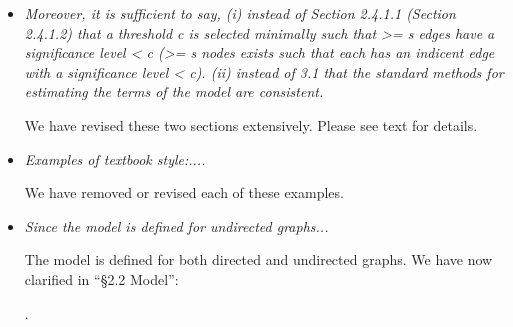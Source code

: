 \documentclass[11pt]{article}
\begin{document}
\begin{itemize}
	\item \emph{Moreover, it is sufficient to say, (i) instead of Section 2.4.1.1 (Section 2.4.1.2) that a threshold c is selected minimally such that >= s edges have a significance level < c (>= s nodes exists such that each has an indicent edge with a significance level < c). (ii) instead of 3.1 that the standard methods for estimating the terms of the model are consistent.}
	
	We have revised these two sections extensively.  Please see text for details.
	
	
	\item \emph{Examples of textbook style:....}
	
	We have removed or revised each of these examples.
	
	\item \emph{Since the model is defined for undirected graphs...}

	The model is defined for both directed and undirected graphs.  We have now clarified in 		``\S 2.2 Model'':
	
	. 
	
\end{itemize}






\end{document}
